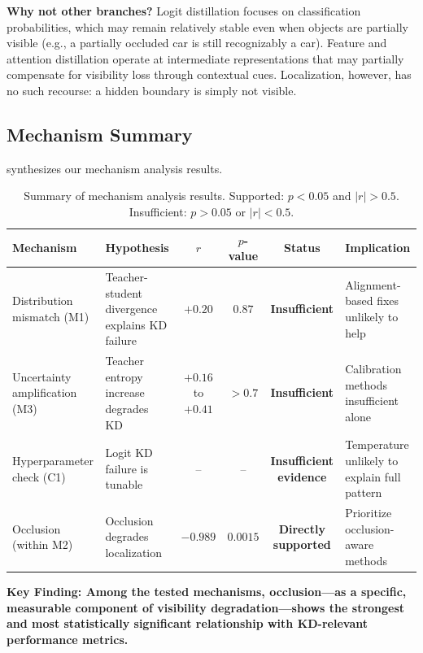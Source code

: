 \textbf{Why not other branches?} Logit distillation focuses on classification probabilities, which may remain relatively stable even when objects are partially visible (e.g., a partially occluded car is still recognizably a car). Feature and attention distillation operate at intermediate representations that may partially compensate for visibility loss through contextual cues. Localization, however, has no such recourse: a hidden boundary is simply not visible.

\subsection{Mechanism Summary}

 synthesizes our mechanism analysis results.

\begin{table}[htbp]
\centering
\caption{Summary of mechanism analysis results. Supported: $p < 0.05$ and $|r| > 0.5$. Insufficient: $p > 0.05$ or $|r| < 0.5$.}
\label{tab:mechanism_summary}
\begin{tabular}{@{}p{3cm}p{4.5cm}cccp{3cm}@{}}
\toprule
Mechanism & Hypothesis & $r$ & $p$-value & Status & Implication \\
\midrule
Distribution mismatch (M1) & Teacher-student divergence explains KD failure & $+0.20$ & $0.87$ & \textbf{Insufficient} & Alignment-based fixes unlikely to help \\
Uncertainty amplification (M3) & Teacher entropy increase degrades KD & $+0.16$ to $+0.41$ & $>0.7$ & \textbf{Insufficient} & Calibration methods insufficient alone \\
Hyperparameter check (C1) & Logit KD failure is tunable & -- & -- & \textbf{Insufficient evidence} & Temperature unlikely to explain full pattern \\
Occlusion (within M2) & Occlusion degrades localization & $\mathbf{-0.989}$ & $\mathbf{0.0015}$ & \textbf{Directly supported} & Prioritize occlusion-aware methods \\
\bottomrule
\end{tabular}
\end{table}

\textbf{Key Finding: Among the tested mechanisms, occlusion---as a specific, measurable component of visibility degradation---shows the strongest and most statistically significant relationship with KD-relevant performance metrics.}

